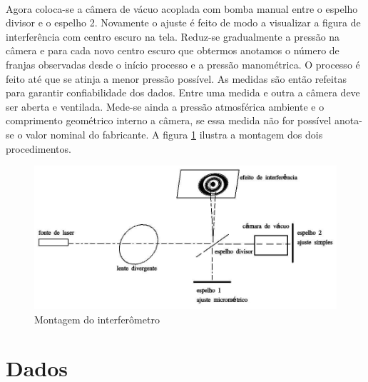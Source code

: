 \documentclass[a4paper,11pt]{article}
\begin{document}
\paragraph{} Agora coloca-se a câmera de vácuo acoplada com bomba manual entre o espelho divisor e o espelho 2. Novamente o ajuste é feito de modo a 
visualizar a figura de interferência com centro escuro na tela. Reduz-se gradualmente a pressão na câmera e para cada novo centro escuro 
que obtermos anotamos o número de franjas observadas desde o início processo e a pressão manométrica. O processo é feito até que se atinja a menor 
pressão possível. As medidas são então refeitas para garantir confiabilidade dos dados. Entre uma medida e outra a câmera deve ser aberta e ventilada. Mede-se ainda a pressão atmosférica ambiente e o comprimento geométrico interno a câmera, se essa medida não for possível anota-se o valor
nominal do fabricante. A figura \ref{montagem} ilustra a montagem dos dois procedimentos.
\FloatBarrier
\begin{figure}[H]
	\includegraphics[scale=0.4]{./images/montagem.jpeg}
	\caption{Montagem do interferômetro}
	\label{montagem}
\end{figure}
\FloatBarrier
\newpage

\section{Dados}
\end{document}
